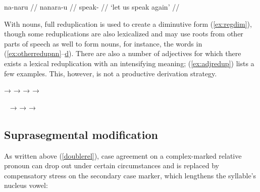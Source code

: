 \a\label{ex:hort+iter}\begingl
	\gla na-naru //
	\glb na\til{}nara-u //
	\glc \Iter{}\til{}speak-\Imp{} //
	\glft `let us speak again' //
\endgl

\xe

With nouns, full reduplication is used to create a diminutive
form (\ref{ex:regdim}), though some reduplications are also lexicalized and may
use roots from other parts of speech as well to form nouns, for instance, the
words in (\ref{ex:otherredupnn}--\hyperref[ex:otherredupvb]{d}). There are also
a number of adjectives for which there exists a lexical reduplication with an
intensifying meaning; (\ref{ex:adjredup}) lists a few examples. This, however,
is not a productive derivation strategy.

\pex
	\a {}
		→ \label{ex:regdim}
	\a {}
		→ %
			\label{ex:otherredupnn}
	\a {}
		→  
			\label{ex:otherredupadj}
	\a {} → 
			\label{ex:otherredupvb}
\xe

\pex~\label{ex:adjredup}
	\a {}
		→ 
	\a {}
		→ 
	\a {}
		→ 
\xe


\subsection{Suprasegmental modification}

As written above (\autoref{doublerel}), case agreement on a complex-marked 
relative pronoun can drop out under certain 
circumstances and is replaced by compensatory stress on the secondary case 
marker, which lengthens the syllable's nucleus vowel:

